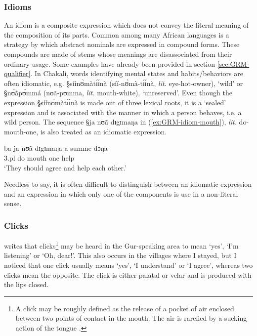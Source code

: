 \subsubsection{Idioms}
\label{sec:GRM-idiom}

An idiom is a  composite expression which does not convey the literal  meaning
 of the composition  of its parts. Common among many African languages is a
strategy by which  abstract nominals are expressed in compound forms. These
compounds are made of stems whose meanings are disassociated from their ordinary
usage. Some examples have already been provided in section
\ref{sec:GRM-qualifier}. 
In Chakali, words identifying mental states and habits/behaviors are
often idiomatic, e.g. {\S síínʊ̀màtɪ́ɪ́nà} ({síí-nʊ̀mà-tɪ́ɪ́nà}, {\it
lit.} eye-hot-owner), `wild' or {\S nʊ̀ã̀pʊ̀mmá} ({nʊã-pʊmma}, {\it lit.} 
mouth-white), `unreserved'. Even though the expression {\S síínʊ̀màtɪ́ɪ́nà}
is made out of three lexical
roots, it is a `sealed' expression and is associated with the manner in which a
person behaves, i.e. a wild person. The sequence {\S ja
nʊã dɪgɪmaŋa} in (\ref{ex:GRM-idiom-mouth}), {\it lit.} do-mouth-one,  is also
treated as an idiomatic expression.


\begin{exe}
 \ex\label{ex:GRM-idiom-mouth}
   \gll   ba ja nʊã dɪgɪmaŋa a summe dɔŋa\\
{\sc 3.pl} do mouth one {\conn} help {\recp} \\
\glt `They should agree and help each other.'

\end{exe}

Needless to say, it is often difficult to  distinguish between an idiomatic
expression and  an expression in which only one of the  components is use in a
 non-literal sense.



\subsubsection{Clicks}
\label{sec:GRM-greet}

\citet[151]{Nade89} writes that clicks\footnote{A click may be roughly defined
as  the release of a pocket of air enclosed between two points of contact in
the mouth. The air is rarefied by a sucking action of the tongue
\cite[see][]{Lade93}.}  may be  heard in the Gur-speaking area to  mean `yes',
`I'm listening' or `Oh, dear!'.  This also occurs in the villages where I
stayed, but
I noticed that one click usually means `yes', `I understand' or `I agree',
whereas two clicks mean the opposite. The click is either palatal or velar and
is produced with the lips closed.





